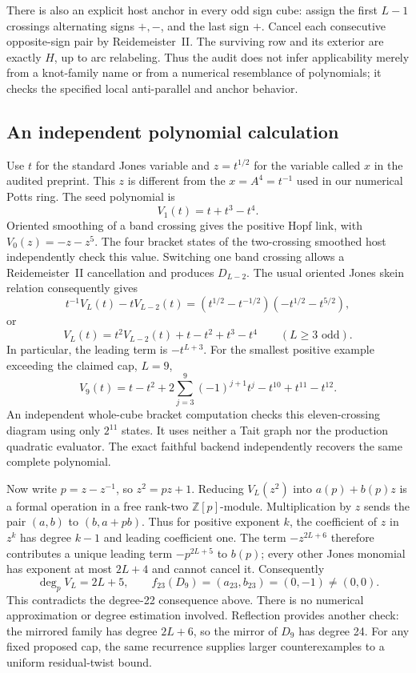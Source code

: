 There is also an explicit host anchor in every odd sign cube: assign the
first $L-1$ crossings alternating signs $+,-$, and the last sign $+$.
Cancel each consecutive opposite-sign pair by Reidemeister~II.  The
surviving row and its exterior are exactly $H$, up to arc relabeling.
Thus the audit does not infer applicability merely from a knot-family
name or from a numerical resemblance of polynomials; it checks the
specified local anti-parallel and anchor behavior.

\subsection{An independent polynomial calculation}

Use $t$ for the standard Jones variable and $z=t^{1/2}$ for the variable
called $x$ in the audited preprint.  This $z$ is different from the
$x=A^4=t^{-1}$ used in our numerical Potts ring.
The seed polynomial is
\[
 V_1(t)=t+t^3-t^4.
\]
Oriented smoothing of a band crossing gives the positive Hopf link,
with $V_0(z)=-z-z^5$.  The four bracket states of the two-crossing
smoothed host independently check this value.  Switching one band
crossing allows a Reidemeister~II cancellation and produces $D_{L-2}$.
The usual oriented Jones skein relation consequently gives
\[
 t^{-1}V_L(t)-t V_{L-2}(t)
 =(t^{1/2}-t^{-1/2})(-t^{1/2}-t^{5/2}),
\]
or
\[
 V_L(t)=t^2V_{L-2}(t)+t-t^2+t^3-t^4\qquad(L\ge3\text{ odd}).
\]
In particular, the leading term is $-t^{L+3}$.  For the smallest positive
example exceeding the claimed cap, $L=9$,
\[
 V_9(t)=t-t^2+2\sum_{j=3}^{9}(-1)^{j+1}t^j-t^{10}+t^{11}-t^{12}.
\]
An independent whole-cube bracket computation checks this eleven-crossing
diagram using only $2^{11}$ states.  It uses neither a Tait graph nor the
production quadratic evaluator.  The exact faithful backend independently
recovers the same complete polynomial.

Now write $p=z-z^{-1}$, so $z^2=pz+1$.  Reducing $V_L(z^2)$ into
$a(p)+b(p)z$ is a formal operation in a free rank-two
$\mathbb Z[p]$-module.  Multiplication by $z$ sends the pair $(a,b)$
to $(b,a+pb)$.  Thus for positive exponent $k$, the coefficient of $z$
in $z^k$ has degree $k-1$ and leading coefficient one.  The term
$-z^{2L+6}$ therefore contributes a unique leading term
$-p^{2L+5}$ to $b(p)$; every other Jones monomial has exponent at most
$2L+4$ and cannot cancel it.  Consequently
\[
 \deg_p V_L=2L+5,\qquad
 f_{23}(D_9)=(a_{23},b_{23})=(0,-1)\ne(0,0).
\]
This contradicts the degree-22 consequence above.  There is no numerical
approximation or degree estimation involved.  Reflection provides another
check: the mirrored family has degree $2L+6$, so the mirror of $D_9$ has
degree 24.  For any fixed proposed cap, the same recurrence supplies
larger counterexamples to a uniform residual-twist bound.

